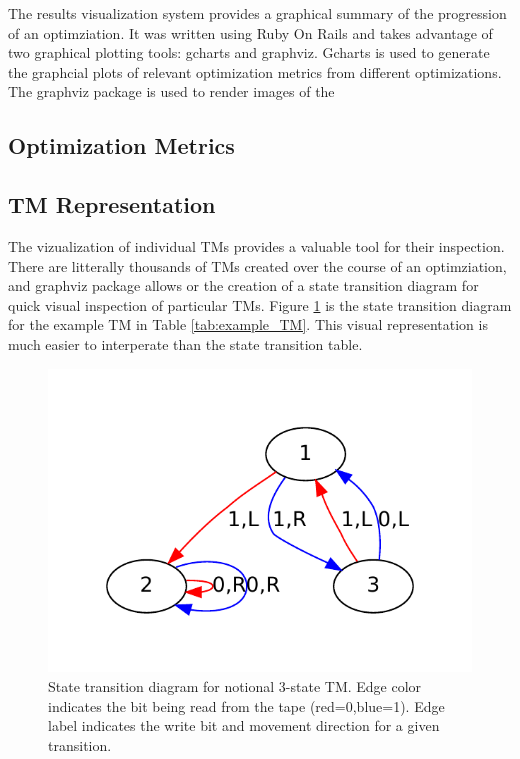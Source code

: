 The results visualization system provides a graphical summary of the progression of an optimziation. It was written using Ruby On Rails and takes advantage of two graphical plotting tools: gcharts and graphviz. Gcharts is used to generate the graphcial plots of relevant optimization metrics from different optimizations. The graphviz package is used to render images of the 

\subsection{Optimization Metrics}

\subsection{TM Representation}
The vizualization of individual TMs provides a valuable tool for their inspection. There are litterally thousands of TMs created over the course of an optimziation, and graphviz package allows or the creation of a state transition diagram for quick visual inspection of particular TMs. Figure \ref{fig:example_TM} is the state transition diagram for the example TM in Table \ref{tab:example_TM}. This visual representation is much easier to interperate than the state transition table. 

\begin{figure}[!hbp]
	\centering 
	\includegraphics[width=.8\textwidth]{images/example_TM}
	\caption{State transition diagram for notional 3-state TM. Edge color indicates the bit being read from the tape (red=0,blue=1). Edge label indicates the write bit and movement direction for a given transition.}
	\label{fig:example_TM}
\end{figure}

